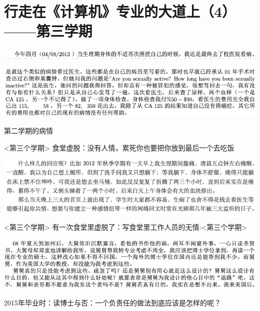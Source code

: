 \documentclass[9pt, b5paper]{article}
\begin{document}
\section{行走在《计算机》专业的大道上（4）——第三学期}
\label{sec:org5806a41}

\begin{center}
\includegraphics[width=.9\linewidth]{./pic/backups_plans_20210424_213118.png}
\end{center}

\begin{center}
\includegraphics[width=.9\linewidth]{./pic/backups_plans_20210424_213150.png}
\end{center}

第二学期的病情

<第三个学期>  食堂虚脱：没有人情，累死你也要把你放到最后一个去吃饭

\begin{center}
\includegraphics[width=.9\linewidth]{./pic/backups_plans_20210424_095434.png}
\end{center}

<第三个学期>  有一次食堂里虚脱了：写食堂里工作人员的无情:<第三个学期>

  \begin{center}
\includegraphics[width=.9\linewidth]{./pic/p1p136-5.png}
\end{center}
2015年毕业时：读博士与否：一个负责任的做法到底应该是怎样的呢？
\end{document}
